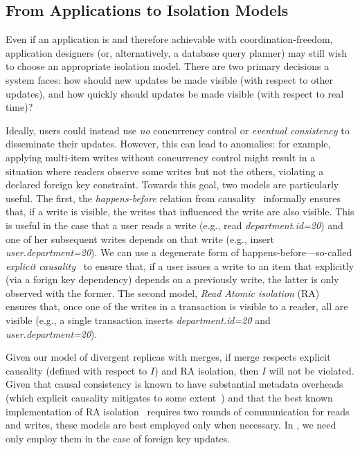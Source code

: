 \subsection{From Applications to Isolation Models}

Even if an application is \iconfluent and therefore achievable with
coordination-freedom, application designers (or, alternatively, a
database query planner) may still wish to choose an appropriate
isolation model. There are two primary decisions a system faces: how
should new updates be made visible (with respect to other updates),
and how quickly should updates be made visible (with respect to real
time)?

 Ideally, users could instead use
\textit{no} concurrency control or \textit{eventual consistency} to
disseminate their \iconfluent updates. However, this can lead to
anomalies: for example, applying multi-item writes without concurrency
control might result in a situation where readers observe some writes
but not the others, violating a declared foreign key
constraint. Towards this goal, two models are particularly useful. The
first, the \textit{happens-before} relation from
causality~\cite{lamportclocks} informally ensures that, if a write is
visible, the writes that influenced the write are also visible. This
is useful in the case that a user reads a write (e.g., read
\textit{department.id=20}) and one of her subsequent writes depends on
that write (e.g., insert \textit{user.department=20}). We can use a
degenerate form of happens-before---so-called \textit{explicit
  causality}~\cite{explicit-socc2012} to ensure that, if a user issues
a write to an item that explicitly (via a forign key dependency)
depends on a previously write, the latter is only observed with the
former. The second model, \textit{Read Atomic isolation}
(RA)~\cite{ramp-txns} ensures that, once one of the writes in a
transaction is visible to a reader, all are visible (e.g., a single
transaction inserts \textit{department.id=20} and
\textit{user.department=20}).

Given our \cfree model of divergent replicas with merges, if merge
respects explicit causality (defined with respect to $I$) and RA
isolation, then $I$ will not be violated. Given that causal
consistency is known to have substantial metadata overheads (which
explicit causality mitigates to some extent~\cite{explicit-socc2012})
and that the best known implementation of RA
isolation~\cite{ramp-txns} requires two rounds of communication for
reads and writes, these models are best employed only when
necessary. In \lang, we need only employ them in the case of foreign
key updates.

